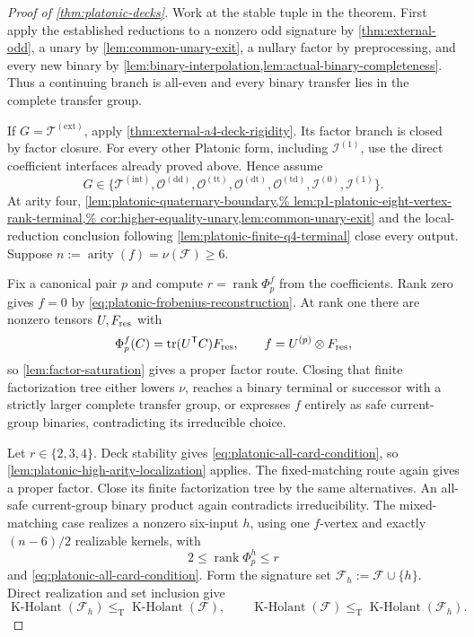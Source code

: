 \documentclass[11pt,letterpaper,onecolumn]{article}
\theoremstyle{plain}
\theoremstyle{definition}
\theoremstyle{remark}
\newcommand{\cF}{\mathcal F}
\newcommand{\KHolant}{\operatorname{K\text{-}Holant}}
\newcommand{\TetInt}{{\mathcal T^{(\mathrm{int})}}}
\newcommand{\TetExt}{{\mathcal T^{(\mathrm{ext})}}}
\newcommand{\OctDD}{{\mathcal O^{(\mathrm{dd})}}}
\newcommand{\OctTT}{{\mathcal O^{(\mathrm{tt})}}}
\newcommand{\OctDT}{{\mathcal O^{(\mathrm{dt})}}}
\newcommand{\OctTD}{{\mathcal O^{(\mathrm{td})}}}
\newcommand{\IcoZero}{{\mathcal I^{(0)}}}
\newcommand{\IcoOne}{{\mathcal I^{(1)}}}
\newcommand{\rank}{\operatorname{rank}}
\newcommand{\arity}{\operatorname{arity}}
\newcommand{\leT}{\leq_{\mathrm T}}
\begin{document}
\begin{proof}[Proof of \cref{thm:platonic-decks}]
Work at the stable tuple in the theorem.  First apply the established reductions to a nonzero odd
signature by \cref{thm:external-odd}, a unary by
\cref{lem:common-unary-exit}, a nullary factor by preprocessing, and every
new binary by
\cref{lem:binary-interpolation,lem:actual-binary-completeness}.  Thus a
continuing branch is all-even and every binary transfer lies in the
complete transfer group.

If \(G=\TetExt\), apply
\cref{thm:external-a4-deck-rigidity}.  Its factor branch is closed by
factor closure.  For every other Platonic form, including
\(\IcoOne\), use the direct coefficient interfaces already proved
above.  Hence assume
\[
 G\in\{\TetInt,\OctDD,\OctTT,\OctDT,
          \OctTD,\IcoZero,\IcoOne\}.
\]
At arity four,
\cref{lem:platonic-quaternary-boundary,%
lem:p1-platonic-eight-vertex-rank-terminal,%
cor:higher-equality-unary,lem:common-unary-exit}
and the local-reduction conclusion following
\cref{lem:platonic-finite-q4-terminal} close every output.  Suppose
\(n:=\arity(f)=\nu(\cF)\ge6\).

Fix a canonical pair \(p\) and compute \(r=\rank\Phi_p^f\) from the coefficients.  Rank zero gives \(f=0\) by
\cref{eq:platonic-frobenius-reconstruction}.  At rank one there are nonzero
tensors \(U,F_{\rm res}\) with
\[
 \Phi_p^f(C)=\operatorname{tr}(U^{\mathsf T}C)F_{\rm res},
 \qquad f=U^{(p)}\otimes F_{\rm res},
\]
so \cref{lem:factor-saturation} gives a proper factor route.  Closing that
finite factorization tree either lowers \(\nu\), reaches a binary terminal or
successor with a strictly larger complete transfer group, or expresses \(f\) entirely as safe current-group
binaries, contradicting its irreducible choice.

Let \(r\in\{2,3,4\}\).  Deck stability gives \cref{eq:platonic-all-card-condition}, so
\cref{lem:platonic-high-arity-localization} applies.  The
fixed-matching route again gives a proper factor.  Close its finite factorization tree by the same alternatives. An all-safe current-group binary product
again contradicts irreducibility.  The mixed-matching case
realizes a nonzero
six-input \(h\), using one \(f\)-vertex and exactly \((n-6)/2\) realizable
kernels, with
\[
 2\le\rank\Phi_p^h\le r
\]
and \cref{eq:platonic-all-card-condition}.  Form the signature set
\(\cF_h:=\cF\cup\{h\}\).  Direct realization and set inclusion
give
\[
 \KHolant(\cF_h)\leT\KHolant(\cF),
 \qquad
 \KHolant(\cF)\leT\KHolant(\cF_h).
\]


\end{proof}
\end{document}
